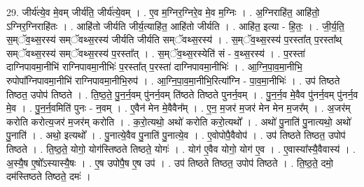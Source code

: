 \documentclass[17pt]{extarticle}
\begin{document}
29. जीर्य॑त्ये॒व मे॒वम् जीर्य॑ति॒ जीर्य॑त्ये॒वम् । . ए॒व म॒ग्निर॒ग्निरे॒व मे॒व म॒ग्निः । . अ॒ग्निराहि॑त॒ आहि॑तो॒ ऽग्निर॒ग्निराहि॑तः । . आहि॑तो जीर्यति जीर्य॒त्याहि॑त॒ आहि॑तो जीर्यति । . आहि॑त॒ इत्या - हि॒तः॒ । . जी॒र्य॒ति॒ स॒म्ॅव॒थ्स॒रस्य॑ सम्ॅवथ्स॒रस्य॑ जीर्यति जीर्यति सम्ॅवथ्स॒रस्य॑ । . स॒म्ॅव॒थ्स॒रस्य॑ प॒रस्ता᳚त् प॒रस्ता᳚थ् सम्ॅवथ्स॒रस्य॑ सम्ॅवथ्स॒रस्य॑ प॒रस्ता᳚त् । . स॒म्ॅव॒थ्स॒रस्येति॑ सं - व॒थ्स॒रस्य॑ । . प॒रस्ता॑ दाग्निपावमा॒नीभि॑ राग्निपावमा॒नीभिः॑ प॒रस्ता᳚त् प॒रस्ता॑ दाग्निपावमा॒नीभिः॑ । . आ॒ग्नि॒पा॒व॒मा॒नीभि॒ रुपोपा᳚ग्निपावमा॒नीभि॑ राग्निपावमा॒नीभि॒रुप॑ । . आ॒ग्नि॒पा॒व॒मा॒नीभि॒रित्या᳚ग्नि - पा॒व॒मा॒नीभिः॑ । . उप॑ तिष्ठते तिष्ठत॒ उपोप॑ तिष्ठते । . ति॒ष्ठ॒ते॒ पु॒न॒र्न॒वम् पु॑नर्न॒वम् ति॑ष्ठते तिष्ठते पुनर्न॒वम् । . पु॒न॒र्न॒व मे॒वैव पु॑नर्न॒वम् पु॑नर्न॒व मे॒व । . पु॒न॒र्न॒वमिति॑ पुनः - न॒वम् । . ए॒वैन॑ मेन मे॒वैवैन᳚म् । . ए॒न॒ म॒जर॑ म॒जर॑ मेन मेन म॒जर᳚म् । . अ॒जर॑म् करोति करोत्य॒जर॑ म॒जर॑म् करोति । . क॒रो॒त्यथो॒ अथो॑ करोति करो॒त्यथो᳚ । . अथो॑ पु॒नाति॑ पु॒नात्यथो॒ अथो॑ पु॒नाति॑ । . अथो॒ इत्यथो᳚ । . पु॒नात्ये॒वैव पु॒नाति॑ पु॒नात्ये॒व । . ए॒वोपोपै॒वैवोप॑ । . उप॑ तिष्ठते तिष्ठत॒ उपोप॑ तिष्ठते । . ति॒ष्ठ॒ते॒ योगो॒ योग॑स्तिष्ठते तिष्ठते॒ योगः॑ । . योग॑ ए॒वैव योगो॒ योग॑ ए॒व । . ए॒वास्या᳚स्यै॒वैवास्य॑ । . अ॒स्यै॒ष ए॒षो᳚ऽस्यास्यै॒षः । . ए॒ष उपोपै॒ष ए॒ष उप॑ । . उप॑ तिष्ठते तिष्ठत॒ उपोप॑ तिष्ठते । . ति॒ष्ठ॒ते॒ दमो॒ दम॑स्तिष्ठते तिष्ठते॒ दमः॑ । \newline
\end{document}
